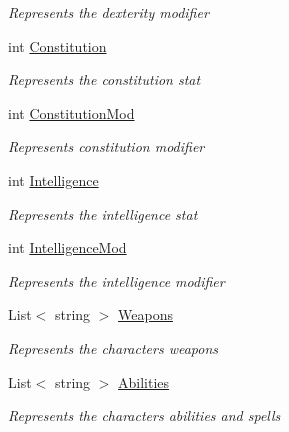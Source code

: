 \begin{DoxyCompactItemize}
\begin{DoxyCompactList}\small\item\em Represents the dexterity modifier \end{DoxyCompactList}\item 
int \mbox{\hyperlink{class_dungeons__n___dragons___manager_1_1_models_1_1_character_a2f44cd99469264387287c3b10ef71094}{Constitution}}
\begin{DoxyCompactList}\small\item\em Represents the constitution stat \end{DoxyCompactList}\item 
int \mbox{\hyperlink{class_dungeons__n___dragons___manager_1_1_models_1_1_character_a983f798dfcb506a53fa0b266c7f04b95}{Constitution\+Mod}}
\begin{DoxyCompactList}\small\item\em Represents constitution modifier \end{DoxyCompactList}\item 
int \mbox{\hyperlink{class_dungeons__n___dragons___manager_1_1_models_1_1_character_afcd43ddd077750957eb9fd5c67f3c271}{Intelligence}}
\begin{DoxyCompactList}\small\item\em Represents the intelligence stat \end{DoxyCompactList}\item 
int \mbox{\hyperlink{class_dungeons__n___dragons___manager_1_1_models_1_1_character_a2e46a39bb985693429ee480a23b58bdf}{Intelligence\+Mod}}
\begin{DoxyCompactList}\small\item\em Represents the intelligence modifier \end{DoxyCompactList}\item 
List$<$ string $>$ \mbox{\hyperlink{class_dungeons__n___dragons___manager_1_1_models_1_1_character_a882f053cd660fa558a1a54dc93e99e23}{Weapons}}
\begin{DoxyCompactList}\small\item\em Represents the character\textquotesingle{}s weapons \end{DoxyCompactList}\item 
List$<$ string $>$ \mbox{\hyperlink{class_dungeons__n___dragons___manager_1_1_models_1_1_character_ae275052b8097c606e5a22373df678c55}{Abilities}}
\begin{DoxyCompactList}\small\item\em Represents the character\textquotesingle{}s abilities and spells \end{DoxyCompactList}\end{DoxyCompactItemize}


